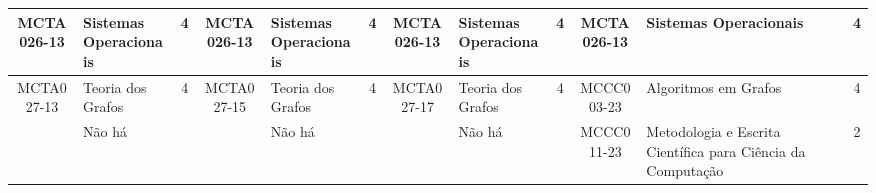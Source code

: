 \documentclass[a4paper]{article}
\begin{document}
\begin{landscape}
{\begin{longtable}{|c|p{.2\textheight}|c||c|p{.2\textheight}|c||c|p{.2\textheight}|c||c|p{.2\textheight}|c|}
    MCTA026-13 & Sistemas Operacionais & 4 & 
    MCTA026-13 & Sistemas Operacionais & 4 & 
    MCTA026-13 & Sistemas Operacionais & 4 & 
    MCTA026-13 & Sistemas Operacionais & 4 \\ \hline

    MCTA027-13 & Teoria dos Grafos & 4 &
    MCTA027-15 & Teoria dos Grafos & 4 &
    MCTA027-17 & Teoria dos Grafos & 4 &
    MCCC003-23 & Algoritmos em Grafos & 4 \\ \hline

    & Não há & &
    & Não há & & 
    & Não há & & 
    MCCC011-23 & Metodologia e Escrita Científica para Ciência da Computação & 2 \\ \hline

\end{longtable}
}
\end{landscape}
\end{document}

